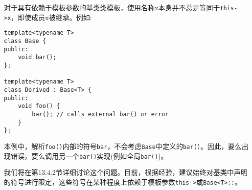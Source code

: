 对于具有依赖于模板参数的基类类模板，使用名称x本身并不总是等同于\texttt{this->x}，即使成员x被继承。例如:

\begin{lstlisting}[style=styleCXX]
template<typename T>
class Base {
public:
	void bar();
};

template<typename T>
class Derived : Base<T> {
public:
	void foo() {
		bar(); // calls external bar() or error
	}
};
\end{lstlisting}

本例中，解析\texttt{foo()}内部的符号\texttt{bar}，不会考虑\texttt{Base}中定义的\texttt{bar()}。因此，要么出现错误，要么调用另一个\texttt{bar()}实现(例如全局\texttt{bar()})。

我们将在第13.4.2节详细讨论这个问题。目前，根据经验，建议始终对基类中声明的符号进行限定，这些符号在某种程度上依赖于模板参数\texttt{this->}或\texttt{Base<T>::}。














































